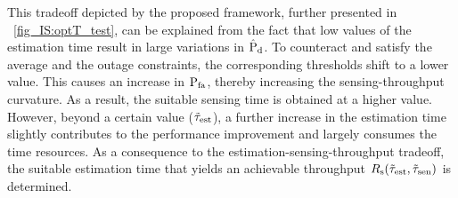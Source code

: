 {{This tradeoff depicted by the proposed framework, further presented in \figurename~\ref{fig_IS:optT_test}, can be explained from the fact that low values of the estimation time result in large variations in $\hat{\text{P}}_{\text{d}}$.} To counteract and satisfy the average and the outage constraints, the corresponding thresholds shift to a lower value. This causes an increase in $\text{P}_{\text{fa}}$, thereby increasing the sensing-throughput curvature. As a result, the suitable sensing time is obtained at a higher value. However, beyond a certain value ($\tilde{\tau}_{\text{est}}$), a further increase in the estimation time slightly contributes to the performance improvement and largely consumes the time resources. As a consequence to the estimation-sensing-throughput tradeoff, the suitable estimation time that yields an achievable throughput $R_{\text{s}}(\tilde{\tau}_{\text{est}},\tilde{\tau}_{\text{sen}})$ is determined. 

\begin{figure}[!t]


\centering
{}
\end{figure}}
